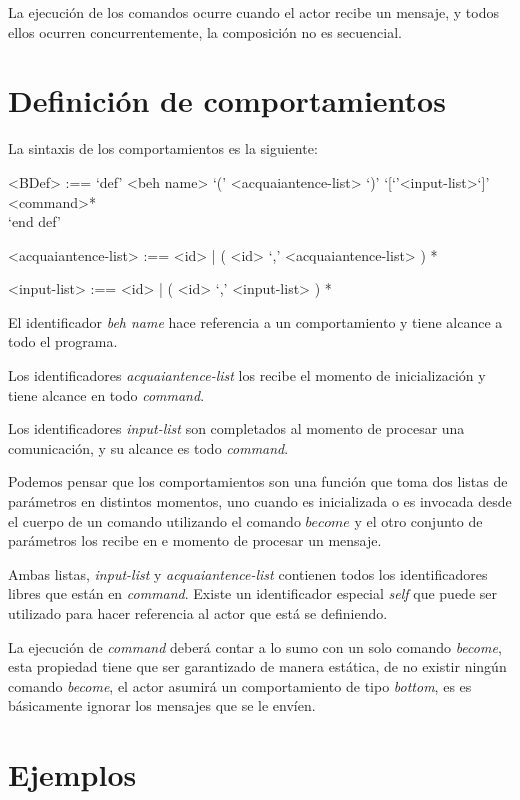 La ejecución de los comandos ocurre cuando el actor recibe un mensaje, y todos
ellos ocurren concurrentemente, la composición no es secuencial.

\section{Definición de comportamientos}

La sintaxis de los comportamientos es la siguiente:

\begin{grammar}
<BDef> :== `def' <beh name> `(' <acquaiantence-list> `)' `[`'<input-list>`]' \\
\quad \quad <command>*  \\
\quad `end def'
  
<acquaiantence-list> :== <id> | ( <id> `,' <acquaiantence-list> ) *
  
<input-list> :== <id> | ( <id> `,' <input-list> ) *
\end{grammar}

El identificador \textit{beh name} hace referencia a un comportamiento y tiene alcance a todo el programa. 

Los identificadores \textit{acquaiantence-list} los recibe el momento de inicialización y tiene alcance en todo \textit{command}. 

Los identificadores \textit{input-list} son completados al momento de procesar una comunicación, y su alcance es todo \textit{command}. 

Podemos pensar que los comportamientos son una función que toma dos listas de parámetros en distintos momentos, uno cuando es inicializada o es invocada desde el cuerpo de un comando utilizando el comando $become$ y el otro conjunto de parámetros los recibe en e momento de procesar un mensaje.

Ambas listas, \textit{input-list} y \textit{acquaiantence-list} contienen todos los identificadores libres que están en \textit{command}. Existe un identificador especial \textit{self} que puede ser utilizado para hacer referencia al actor que está se definiendo. 

La ejecución de \textit{command} deberá contar a lo sumo con un solo comando \textit{become}, esta propiedad tiene que ser garantizado de manera estática, de no existir ningún comando \textit{become}, el actor asumirá un comportamiento de tipo \textit{bottom}, es es básicamente ignorar los mensajes que se le envíen.

\section{Ejemplos}

